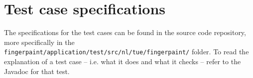 \chapter{Test case specifications}\label{chap:testcasespec}
The specifications for the test cases can be found in the source code repository, more specifically in the \texttt{fingerpaint/application/test/src/nl/tue/fingerpaint/} folder. %
To read the explanation of a test case -- i.e. what it does and what it checks -- refer to the Javadoc for that test.


% 
% 
% 
% 
% 
